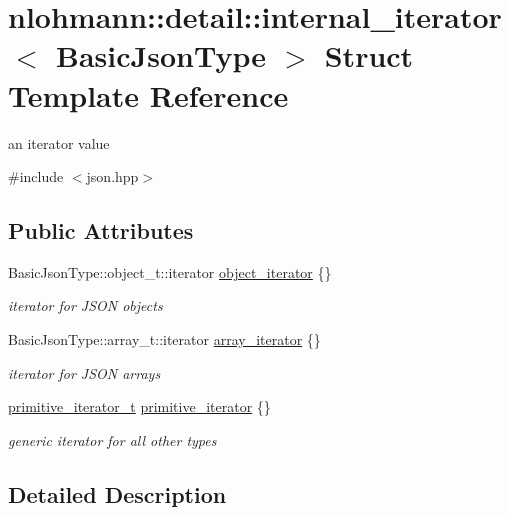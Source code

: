 \hypertarget{structnlohmann_1_1detail_1_1internal__iterator}{}\section{nlohmann\+::detail\+::internal\+\_\+iterator$<$ Basic\+Json\+Type $>$ Struct Template Reference}
\label{structnlohmann_1_1detail_1_1internal__iterator}


an iterator value  




{\ttfamily \#include $<$json.\+hpp$>$}

\subsection*{Public Attributes}
\begin{DoxyCompactItemize}
\item 
Basic\+Json\+Type\+::object\+\_\+t\+::iterator \mbox{\hyperlink{structnlohmann_1_1detail_1_1internal__iterator_a8cb0af3498061426c1d0a65ad6220408}{object\+\_\+iterator}} \{\}
\begin{DoxyCompactList}\small\item\em iterator for J\+S\+ON objects \end{DoxyCompactList}\item 
Basic\+Json\+Type\+::array\+\_\+t\+::iterator \mbox{\hyperlink{structnlohmann_1_1detail_1_1internal__iterator_a8294a6e6f01b58e1cce8fbae66a50b5d}{array\+\_\+iterator}} \{\}
\begin{DoxyCompactList}\small\item\em iterator for J\+S\+ON arrays \end{DoxyCompactList}\item 
\mbox{\hyperlink{classnlohmann_1_1detail_1_1primitive__iterator__t}{primitive\+\_\+iterator\+\_\+t}} \mbox{\hyperlink{structnlohmann_1_1detail_1_1internal__iterator_a2b3bb45f968210e42c282017eeeb63a8}{primitive\+\_\+iterator}} \{\}
\begin{DoxyCompactList}\small\item\em generic iterator for all other types \end{DoxyCompactList}\end{DoxyCompactItemize}


\subsection{Detailed Description}
